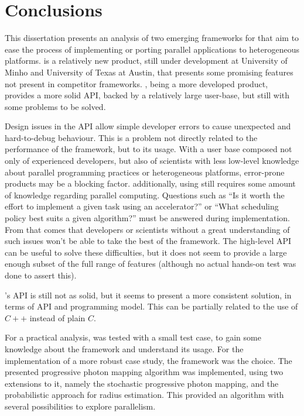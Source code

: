 \documentclass[main.tex]{subfiles}
\begin{document}
\chapter{Conclusions} \label{chapter:conclusions}

This dissertation presents an analysis of two emerging frameworks for that aim to ease the process of implementing or porting parallel applications to heterogeneous platforms. \gama is a relatively new product, still under development at University of Minho and University of Texas at Austin, that presents some promising features not present in competitor frameworks. \starpu, being a more developed product, provides a more solid API, backed by a relatively large user-base, but still with some problems to be solved.

Design issues in the \starpu API allow simple developer errors to cause unexpected and hard-to-debug behaviour. This is a problem not directly related to the performance of the framework, but to its usage. With a user base composed not only of experienced developers, but also of scientists with less low-level knowledge about parallel programming practices or heterogeneous platforms, error-prone products may be a blocking factor. additionally, using \starpu still requires some amount of knowledge regarding parallel computing. Questions such as ``Is it worth the effort to implement a given task using an accelerator?'' or ``What scheduling policy best suits a given algorithm?'' must be answered during implementation. From that comes that developers or scientists without a great understanding of such issues won't be able to take the best of the framework.
The high-level \starpu API can be useful to solve these difficulties, but it does not seem to provide a large enough subset of the full range of \starpu features (although no actual hands-on test was done to assert this).

\gama's API is still not as solid, but it seems to present a more consistent solution, in terms of API and programming model. This can be partially related to the use of $C++$ instead of plain $C$.


For a practical analysis, \gama was tested with a small test case, to gain some knowledge about the framework and understand its usage. For the implementation of a more robust case study, the \starpu framework was the choice. The presented progressive photon mapping algorithm was implemented, using two extensions to it, namely the stochastic progressive photon mapping, and the probabilistic approach for radius estimation. This provided an algorithm with several possibilities to explore parallelism.
\end{document}
